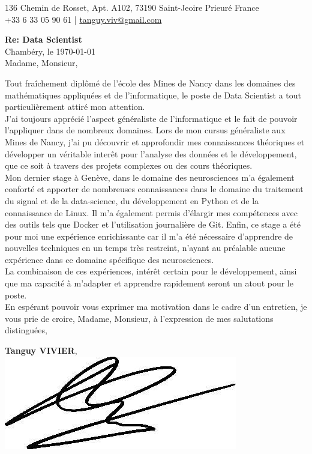 \documentclass[]{cv-style}
\begin{document}
\huge
{}       %
\vspace{-0.9cm}
%
\begin{center}
    \large
    136 Chemin de Rosset, Apt. A102, 73190 Saint-Jeoire Prieuré France \\
    +33 6 33 05 90 61 | \href{tanguy.viv@gmail.com}{tanguy.viv@gmail.com}
\end{center}
%
\vspace{1.5cm}
\begin{flushleft}
    \large
    \textbf{Re: Data Scientist} \\[0.2cm]
    Chambéry, le \today \\[1cm]
    Madame, Monsieur,
\end{flushleft}
\vspace{0.4cm}
\large
Tout fraîchement diplômé de l'école des Mines de Nancy dans les domaines des
mathématiques appliquées et de l'informatique, le poste de Data Scientist a 
tout particulièrement attiré mon attention. \\[0.5cm]
%
J'ai toujours apprécié l'aspect généraliste de l'informatique et le fait
de pouvoir l'appliquer dans de nombreux domaines. Lors de mon cursus 
généraliste aux Mines de Nancy, j'ai pu découvrir et approfondir mes
connaissances théoriques et développer un véritable interêt pour l'analyse
des données et le développement, que ce soit à travers des projets complexes
ou des cours théoriques. \\[0.5cm]
%
Mon dernier stage à Genève, dans le domaine des neurosciences m'a également
conforté et apporter de nombreuses connaissances dans le domaine du traitement
du signal et de la data-science, du développement en Python et de la
connaissance de Linux. Il m'a également permis d'élargir mes compétences avec
des outils tels que Docker et l'utilisation journalière de Git. Enfin, ce stage
a été pour moi une expérience enrichissante car il m'a été nécessaire
d'apprendre de nouvelles techniques en un temps très restreint, n'ayant au
préalable aucune expérience dans ce domaine spécifique des neurosciences.
\\[0.5cm]
%
La combinaison de ces expériences, intérêt certain pour le développement,
ainsi que ma capacité à m'adapter et apprendre rapidement seront un atout
pour le poste. \\[0.5cm]
%
En espérant pouvoir vous exprimer ma motivation dans le cadre d’un entretien,
je vous prie de croire, Madame, Monsieur, à l’expression de mes salutations
distinguées, \\[0.5cm]
%
\begin{flushright}
\parbox{5cm}{
\centering
    \textbf{Tanguy VIVIER},\\
    \hspace{2cm}\includegraphics[scale=0.4]{signature.jpg}
}
\end{flushright}
\end{document}
